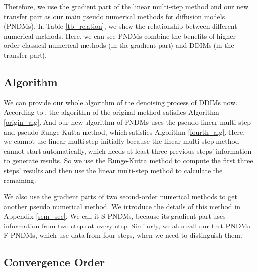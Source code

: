 \documentclass{article}
\begin{document}
Therefore, we use the gradient part of the linear multi-step method and our new transfer part as our main pseudo numerical methods for diffusion models (PNDMs). In Table \ref{tb_relation}, we show the relationship between different numerical methods. Here, we can see PNDMs combine the benefits of higher-order classical numerical methods (in the gradient part) and DDIMs (in the transfer part).

\subsection{Algorithm}
\label{algo_choice}

We can provide our whole algorithm of the denoising process of DDIMs now. According to \citet{Song2020a}, the algorithm of the original method satisfies Algorithm \ref{origin_alg}. And our new algorithm of PNDMs uses the pseudo linear multi-step and pseudo Runge-Kutta method, which satisfies Algorithm \ref{fourth_alg}. Here, we cannot use linear multi-step initially because the linear multi-step method cannot start automatically, which needs at least three previous steps' information to generate results. So we use the Runge-Kutta method to compute the first three steps' results and then use the linear multi-step method to calculate the remaining. 

We also use the gradient parts of two second-order numerical methods to get another pseudo numerical method. We introduce the details of this method in Appendix \ref{som_sec}. We call it S-PNDMs, because its gradient part uses information from two steps at every step. Similarly, we also call our first PNDMs F-PNDMs, which use data from four steps, when we need to distinguish them. 


\subsection{Convergence Order}
\label{sec_corder}
\end{document}
